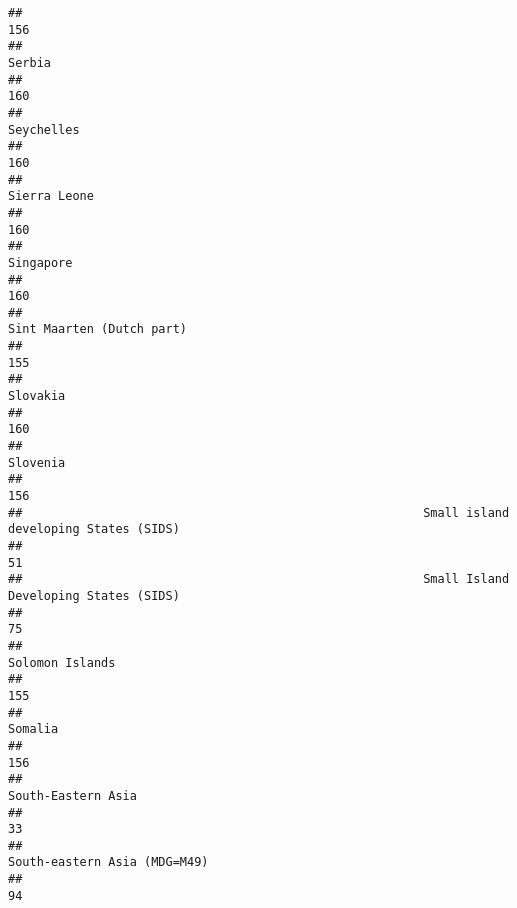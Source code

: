 \documentclass[]{article}
\begin{document}
\begin{verbatim}
##                                                                                          156 
##                                                                                       Serbia 
##                                                                                          160 
##                                                                                   Seychelles 
##                                                                                          160 
##                                                                                 Sierra Leone 
##                                                                                          160 
##                                                                                    Singapore 
##                                                                                          160 
##                                                                    Sint Maarten (Dutch part) 
##                                                                                          155 
##                                                                                     Slovakia 
##                                                                                          160 
##                                                                                     Slovenia 
##                                                                                          156 
##                                                        Small island developing States (SIDS) 
##                                                                                           51 
##                                                        Small Island Developing States (SIDS) 
##                                                                                           75 
##                                                                              Solomon Islands 
##                                                                                          155 
##                                                                                      Somalia 
##                                                                                          156 
##                                                                           South-Eastern Asia 
##                                                                                           33 
##                                                                 South-eastern Asia (MDG=M49) 
##                                                                                           94 

\end{verbatim}
\end{document}
